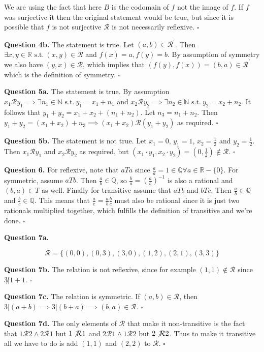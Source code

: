 \documentclass[letterpaper, reqno,11pt]{article}
\newcommand{\RR}{\mathbb{R}}
\newcommand{\QQ}{\mathbb{Q}}
\newcommand{\NN}{\mathbb{N}}
\newcommand{\st}{\text{ s.t.}\ }
\begin{document}
We are using the fact that here $B$ is the codomain of $f$ not the image of $f$. If $f$ was surjective it then the original statement would be true, but since it is possible that $f$ is not surjective $\mathcal{R}$ is not necessarily reflexive. $\square$

{\noindent\bf Question 4b.} The statement is true. Let $(a, b)\in\mathcal{R}^\prime$. Then $\exists x, y\in\RR\st (x, y)\in\mathcal{R}$ and $f(x)=a, f(y)=b$. By assumption of symmetry we also have $(y, x)\in\mathcal{R}$, which implies that $(f(y), f(x))=(b, a)\in\mathcal{R}^\prime$ which is the definition of symmetry. $\square$

{\noindent\bf Question 5a.} The statement is true. By assumption $x_1\mathcal{R}y_1\implies \exists n_1\in\NN\st y_1=x_1+n_1$ and $x_2\mathcal{R}y_2\implies \exists n_2\in\NN\st y_2=x_2+n_2$. It follows that $y_1+y_2 = x_1+x_2+(n_1+n_2)$. Let $n_3=n_1+n_2$. Then $y_1+y_2=(x_1+x_2)+n_3\implies (x_1+x_2)\mathcal{R}(y_1+y_2)$ as required. $\square$

{\noindent\bf Question 5b.} The statement is not true. Let $x_1=0$, $y_1=1$, $x_2=\frac12$ and $y_2=\frac12$. Then $x_1\mathcal{R}y_1$ and $x_2\mathcal{R}y_2$ as required, but $(x_1\cdot y_1, x_2\cdot y_2)=(0, \frac12)\notin\mathcal{R}$. $\square$

{\noindent\bf Question 6.} For reflexive, note that $aTa$ since $\frac aa=1\in\QQ\forall a\in\RR-\{0\}$. For symmetric, assume $aTb$. Then $\frac ab\in\QQ$, so $\frac ba=(\frac ab)^{-1}$ is also a rational and $(b, a)\in T$ as well. Finally for transitive assume that $aTb$ and $bTc$. Then $\frac ab\in\QQ$ and $\frac bc\in\QQ$. This means that $\frac ac=\frac ab\frac bc$ must also be rational since it is just two rationals multiplied together, which fulfills the definition of transitive and we're done. $\square$

{\noindent\bf Question 7a.} 

$$
   \mathcal{R}=\{(0, 0), (0, 3), (3, 0), (1, 2), (2, 1), (3, 3)\}
$$

{\noindent\bf Question 7b.} The relation is not reflexive, since for example $(1, 1)\notin\mathcal{R}$ since $3\not|1+1$. $\square$

{\noindent\bf Question 7c.} The relation is symmetric. If $(a, b)\in\mathcal{R}$, then $3|(a+b)\implies 3|(b+a)\implies (b, a)\in\mathcal{R}$. $\square$

{\noindent\bf Question 7d.} The only elements of $\mathcal{R}$ that make it non-transitive is the fact that $1\mathcal{R}2\wedge 2\mathcal{R}1$ but $1\not\mathcal{R}1$ and $2\mathcal{R}1\wedge 1\mathcal{R}2$ but $2\not\mathcal{R}2$. Thus to make it transitive all we have to do is add $(1, 1)$ and $(2, 2)$ to $\mathcal{R}$. $\square$
\end{document}

